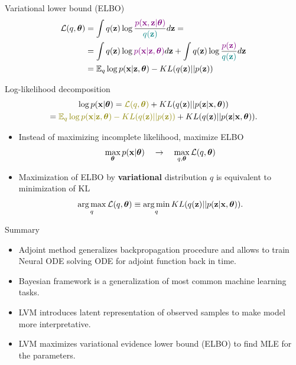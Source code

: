 \begin{frame}{Variational lower bound (ELBO)}
	\vspace{-0.3cm}
	\begin{align*}
		\mathcal{L} (q, \boldsymbol{\theta}) &= \int q(\mathbf{z}) \log \frac{\color{violet}p(\mathbf{x}, \mathbf{z} | \boldsymbol{\theta})}{\color{teal}q(\mathbf{z})}d\mathbf{z} = \\ 
		&= \int q(\mathbf{z}) \log {\color{violet}p(\mathbf{x}| \mathbf{z}, \boldsymbol{\theta})} d\mathbf{z} + \int q(\mathbf{z}) \log \frac{\color{violet}p(\mathbf{z})}{\color{teal}q(\mathbf{z})}d\mathbf{z} \\ 
		&= \mathbb{E}_{q} \log p(\mathbf{x} | \mathbf{z}, \boldsymbol{\theta}) - KL (q(\mathbf{z}) || p(\mathbf{z}))
	\end{align*}
	\vspace{-0.5cm}
	\begin{block}{Log-likelihood decomposition}
		\vspace{-0.8cm}
		\begin{multline*}
			\log p(\bx| \btheta) = {\color{olive}\mathcal{L} (q, \btheta)} + KL(q(\bz) || p(\bz|\bx, \btheta)) \\ = {\color{olive}\mathbb{E}_{q} \log p(\bx | \bz, \btheta) - KL (q(\bz) || p(\bz))} + KL(q(\bz) || p(\bz|\bx, \btheta)).
		\end{multline*}
		\vspace{-0.7cm}
	\end{block}
	\begin{itemize}
		\item Instead of maximizing incomplete likelihood, maximize ELBO
		\[
		\max_{\boldsymbol{\theta}} p(\mathbf{x} | \boldsymbol{\theta}) \quad \rightarrow \quad \max_{q, \boldsymbol{\theta}} \mathcal{L} (q, \boldsymbol{\theta})
		\]
		\item Maximization of ELBO by \textbf{variational} distribution $q$ is equivalent to minimization of KL
		\[
		\operatorname*{arg\,max}_q \mathcal{L} (q, \boldsymbol{\theta}) \equiv \operatorname*{arg\,min}_q KL(q(\mathbf{z}) || p(\mathbf{z}|\mathbf{x}, \boldsymbol{\theta})).
		\]
	\end{itemize}
\end{frame}
\begin{frame}{Summary}
	\begin{itemize}
		\item Adjoint method generalizes backpropagation procedure and allows to train Neural ODE solving ODE for adjoint function back in time.
		\vfill
		\item Bayesian framework is a generalization of most common machine learning tasks.
		\vfill
		\item LVM introduces latent representation of observed samples to make model more interpretative.
		\vfill
		\item LVM maximizes variational evidence lower bound (ELBO) to find MLE for the parameters.
	\end{itemize}
\end{frame}
 